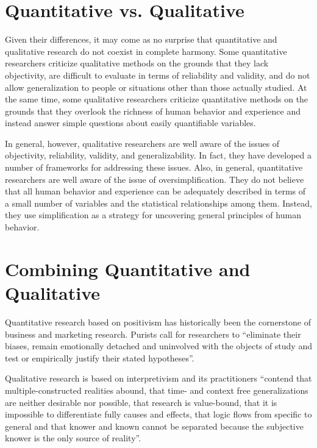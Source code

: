 \section{Quantitative vs. Qualitative}

Given their differences, it may come as no surprise that quantitative and qualitative research do not coexist in complete harmony. Some quantitative researchers criticize qualitative methods on the grounds that they lack objectivity, are difficult to evaluate in terms of reliability and validity, and do not allow generalization to people or situations other than those actually studied. At the same time, some qualitative researchers criticize quantitative methods on the grounds that they overlook the richness of human behavior and experience and instead answer simple questions about easily quantifiable variables.

In general, however, qualitative researchers are well aware of the issues of objectivity, reliability, validity, and generalizability. In fact, they have developed a number of frameworks for addressing these issues. Also, in general, quantitative researchers are well aware of the issue of oversimplification. They do not believe that all human behavior and experience can be adequately described in terms of a small number of variables and the statistical relationships among them. Instead, they use simplification as a strategy for uncovering general principles of human behavior.

\section{Combining Quantitative and Qualitative}

Quantitative research based on \gls{positivism} has historically been the cornerstone of business and marketing research. Purists call for researchers to ``eliminate their biases, remain emotionally detached and uninvolved with the objects of study and test or empirically justify their stated hypotheses''\cite{johnson2004mixed}.

Qualitative research is based on \gls{interpretivism} and its practitioners ``contend that multiple-constructed realities abound, that time- and context free generalizations are neither desirable nor possible, that research is value-bound, that it is impossible to differentiate fully causes and effects, that logic flows from specific to general and that knower and known cannot be separated because the subjective knower is the only source of reality''\cite{johnson2004mixed}.

